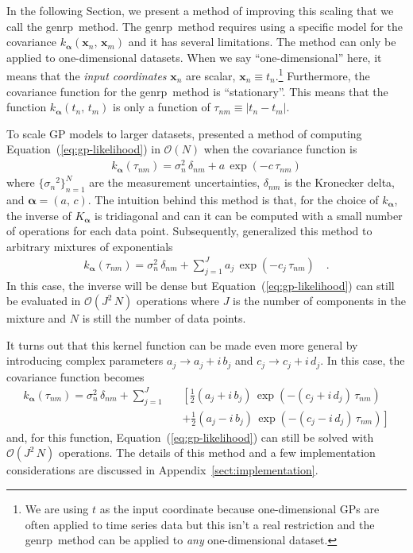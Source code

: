\documentclass[manuscript, letterpaper]{aastex6}
\makeatletter
\let\origsection\section
\renewcommand\section{\@ifstar{\starsection}{\nostarsection}}
\newcommand\nostarsection[1]{\sectionprelude\origsection{#1}}
\newcommand\starsection[1]{\sectionprelude\origsection*{#1}}
\newcommand\sectionprelude{\vspace{1em}}
\newcommand{\project}[1]{\textsf{#1}}
\newcommand{\genrp}{\project{genrp}}
\renewcommand{\eqref}[1]{\ref{eq:#1}}
\newcommand{\Eq}[1]{Equation~(\eqref{#1})}
\newcommand{\eq}[1]{\Eq{#1}}
\newcommand{\eqlabel}[1]{\label{eq:#1}}
\newcommand{\sectref}[1]{\ref{sect:#1}}
\newcommand{\App}[1]{Appendix~\sectref{#1}}
\newcommand{\app}[1]{\App{#1}}
\newcommand{\bvec}[1]{{\ensuremath{\boldsymbol{#1}}}}
\makeatother
\begin{document}
In the following Section, we present a method of improving this scaling that
we call the \genrp\ method.
The \genrp\ method requires using a specific model for the covariance
$k_\bvec{\alpha}(\bvec{x}_n,\,\bvec{x}_m)$ and it has several limitations.
The method can only be applied to one-dimensional datasets.
When we say ``one-dimensional'' here, it means that the \emph{input
coordinates} $\bvec{x}_n$ are scalar, $\bvec{x}_n \equiv t_n$.\footnote{We are
using $t$ as the input coordinate because one-dimensional GPs are often
applied to time series data but this isn't a real restriction and the \genrp\
method can be applied to \emph{any} one-dimensional dataset.}
Furthermore, the covariance function for the \genrp\ method is ``stationary''.
This means that the function $k_\bvec{\alpha}(t_n,\,t_m)$ is only a function
of $\tau_{nm} \equiv |t_n - t_m|$.


\section{The genrp model}

To scale GP models to larger datasets, \citet{Rybicki:1995} presented a method
of computing \eq{gp-likelihood} in $\mathcal{O}(N)$ when the covariance
function is
\begin{eqnarray}
k_\bvec{\alpha}(\tau_{nm}) = \sigma_n^2\,\delta_{nm} + a\,\exp(-c\,\tau_{nm})
\end{eqnarray}
where $\{{\sigma_n}^2\}_{n=1}^N$ are the measurement uncertainties,
$\delta_{nm}$ is the Kronecker delta, and $\bvec{\alpha} = (a,\,c)$.
The intuition behind this method is that, for the choice of $k_\bvec{\alpha}$,
the inverse of $K_\bvec{\alpha}$ is tridiagonal and can it can be computed
with a small number of operations for each data point.
Subsequently, \citet{Ambikasaran:2015} generalized this method to arbitrary
mixtures of exponentials
\begin{eqnarray}
k_\bvec{\alpha}(\tau_{nm}) = \sigma_n^2\,\delta_{nm} +
    \sum_{j=1}^J a_j\,\exp(-c_j\,\tau_{nm})\quad.
\end{eqnarray}
In this case, the inverse will be dense but \eq{gp-likelihood} can still be
evaluated in $\mathcal{O}(J^2\,N)$ operations where $J$ is the number of
components in the mixture and $N$ is still the number of data points.

It turns out that this kernel function can be made even more general by
introducing complex parameters $a_j \to a_j+i\,b_j$ and $c_j \to c_j+i\,d_j$.
In this case, the covariance function becomes
\begin{eqnarray}\eqlabel{genrp-kernel-complex}
k_\bvec{\alpha}(\tau_{nm}) = \sigma_n^2\,\delta_{nm} +
    \sum_{j=1}^J &&\left[
    \frac{1}{2}(a_j + i\,b_j)\,\exp\left(-(c_j+i\,d_j)\,\tau_{nm}\right)
        \right. \nonumber\\
    &&+\left.
    \frac{1}{2}(a_j - i\,b_j)\,\exp\left(-(c_j-i\,d_j)\,\tau_{nm}\right)
\right]
\end{eqnarray}
and, for this function, \eq{gp-likelihood} can still be solved with
$\mathcal{O}(J^2\,N)$ operations.
The details of this method and a few implementation considerations are
discussed in \app{implementation}.
\end{document}
